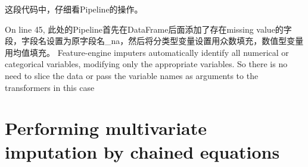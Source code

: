 这段代码中，仔细看Pipeline的操作。

On line 45, 此处的Pipeline首先在DataFrame后面添加了存在missing value的字段，字段名设置为原字段名\_na，然后将分类型变量设置用众数填充，数值型变量用均值填充。 Feature-engine imputers automatically identify all numerical or categorical variables, 
modifying only the appropriate variables. So there is no need to slice the data or pass the 
variable names as arguments to the transformers in this case

\section{Performing multivariate imputation by chained equations}